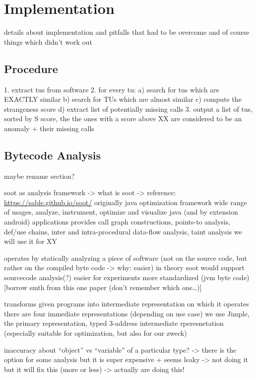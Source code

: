\chapter{Implementation}
details about implementation and pitfalls that had to be overcome
and of course things which didn't work out

\section{Procedure}

1. extract tus from software
2. for every tu:
    a) search for tus which are EXACTLY similar
    b) search for TUs which are almost similar
    c) compute the strangeness score
    d) extract list of potentially missing calls
3. output a list of tus, sorted by S score, the the ones with a score above XX are considered to be an anomaly + their missing calls

\section{Bytecode Analysis}\label{sec:bytecode}
maybe rename section?

soot as analysis framework -> what is soot
-> reference: \url{https://sable.github.io/soot/}
originally java optimization framework
wide range of usages, analyze, instrument, optimize and visualize java (and by extension android) applications
provides call graph constructions, points-to analysis, def/use chains, inter and intra-procedural data-flow analysis,
taint analysis
we will use it for XY

operates by statically analyzing a piece of software
(not on the source code, but rather on the compiled byte code -> why: easier)
in theory soot would support sourcecode analysis(?)
easier for experiments
more standardized (jvm byte code)
[borrow smth from this one paper (don't remember which one\ldots)]

transforms given programs into intermediate representation on which it operates
there are four immediate representations (depending on use case)
we use Jimple, the primary representation, typed 3-address intermediate rperesnetation (especially suitable for optimization, but also for our zweck)

inaccuracy about ``object'' vs ``variable'' of a particular type?
-> there is the option for some analysis but it is super  expensive + seems leaky -> not doing it
but it will fix this (more or less)
-> actually are doing this!

